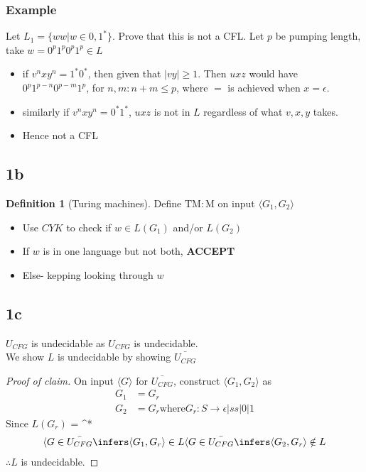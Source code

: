 \documentclass{article}
\def\rarr{\rightarrow}
\newcommand{\tb}[1]{\textbf{#1}}
\newcommand{\mr}[1]{\mathrm{#1}}
\theoremstyle{definition}
\newtheorem{definition}{Definition}[section]
\theoremstyle{remark}
\begin{document}
\subsubsection*{Example}
Let $L_1 = \{ww | w \in {0,1}^*\}$. Prove that this is not a CFL. Let $p$ be pumping length, take $w = 0^p1^p0^p1^p \in L$
\begin{itemize}
    \item if $v^nxy^n = 1^*0^*$, then given that $|vy| \geq 1$. Then $uxz$ would have $0^p1^{p-n}0^{p-m}1^p$, for $n, m : n + m \leq p$, where $=$ is achieved when $x = \epsilon$.
    \item similarly if $v^nxy^n = 0^*1^*$, $uxz$ is not in $L$ regardless of what $v, x, y$ takes.
    \item Hence not a CFL
\end{itemize}

\subsection{1b}
\begin{definition}[Turing machines]
    Define $\mr{TM : M}$ on input $\langle G_1, G_2 \rangle$
\end{definition}

\begin{itemize}
    \item Use $CYK$ to check if $w \in L(G_1)$ and/or $L(G_2)$
    \item If $w$ is in one language but not both, \tb{ACCEPT}
    \item Else- kepping looking through $w$
\end{itemize}

\subsection{1c}
$U_{CFG}$ is undecidable as $U_{CFG}$ is undecidable. \\ 
We show $L$ is undecidable by showing $\bar{U_{CFG}}$
\begin{proof}[Proof of claim]
    On input $\langle G \rangle$ for $\bar{U_{CFG}}$, construct $\langle G_1, G_2 \rangle$ as
    \begin{align*}
        G_1 &= G_r \\
        G_2 &= G_r \text{where} G_r: S \rarr \epsilon|ss|0|1
    \end{align*}
    Since $L(G_r)$ = \Sigma^*
    \begin{align*}
        \langle G \in \bar{U_{CFG}} \infers \langle G_1, G_r \rangle \in L
        \langle G \in \bar{U_{CFG}} \infers \langle G_2, G_r \rangle \notin L
    \end{align*}
    $\therefore L$ is undecidable.
\end{proof}
\end{document}
